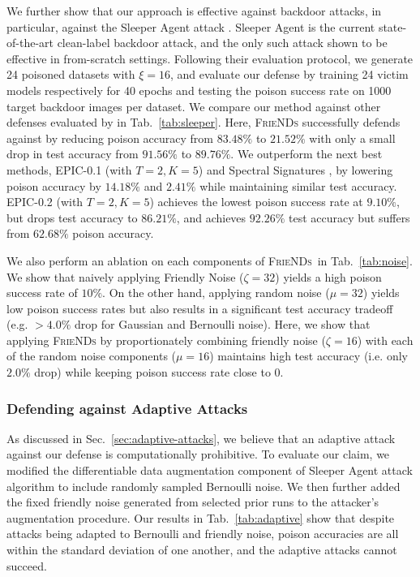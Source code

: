 \documentclass{article}
\newcommand{\alg}{\textsc{FrieNDs}}
\newcommand{\tabref}[1]{Tab.~\ref{#1}}
\newcommand{\secref}[1]{Sec.~\ref{#1}}
\begin{document}
We further show that our approach is effective against backdoor attacks, in particular, against the Sleeper Agent attack \cite{souri2021sleeper}. Sleeper Agent is the current state-of-the-art clean-label backdoor attack, and the only such attack shown to be effective in from-scratch settings. Following their evaluation protocol, we generate 24 poisoned datasets with $\xi=16$, and evaluate our defense by training 24 victim models respectively for 40 epochs and testing the poison success rate on 1000 target backdoor images per dataset. We compare our method against other defenses evaluated by \citep{souri2021sleeper} in \tabref{tab:sleeper}. Here, \alg{} successfully defends against \cite{souri2021sleeper} by reducing poison accuracy from $83.48\%$ to $21.52\%$ with only a small drop in test accuracy from $91.56\%$ to $89.76\%$. We outperform the next best methods, 
EPIC-0.1 \cite{yang2022not} {(with $T=2, K=5$)} and Spectral Signatures \cite{tran2018spectral}, by lowering poison accuracy by $14.18\%$ and $2.41\%$ while maintaining similar test accuracy.
EPIC-0.2 \cite{yang2022not} {(with $T=2, K=5$)} achieves the lowest poison success rate at $9.10\%$, but drops test accuracy to $86.21\%$, and \cite{gao2019strip} achieves $92.26\%$ test accuracy but suffers from $62.68\%$ poison accuracy. 

We also perform an ablation on each components of \alg\ in \tabref{tab:noise}. We show that naively applying Friendly Noise ($\zeta=32$) yields a high poison success rate of $10\%$. On the other hand, applying random noise ($\mu=32$) yields low poison success rates but also results in a significant test accuracy tradeoff (e.g. $>4.0\%$ drop for Gaussian and Bernoulli noise). Here, we show that applying \alg{} by proportionately combining friendly noise ($\zeta=16$) with each of the random noise components ($\mu=16$) maintains high test accuracy (i.e. only $2.0\%$ drop) while keeping poison success rate close to 0.

\subsubsection{Defending against Adaptive Attacks}


As discussed in \secref{sec:adaptive-attacks}, we believe that an adaptive attack against our defense is computationally prohibitive. To evaluate our claim, we modified the differentiable data augmentation component of Sleeper Agent attack algorithm to include randomly sampled Bernoulli noise. We then further added the fixed friendly noise generated from selected prior runs to the attacker’s augmentation procedure. Our results in \tabref{tab:adaptive} show that despite attacks being adapted to Bernoulli and friendly noise, poison accuracies are all within the standard deviation of one another, and the adaptive attacks cannot succeed.
\end{document}
